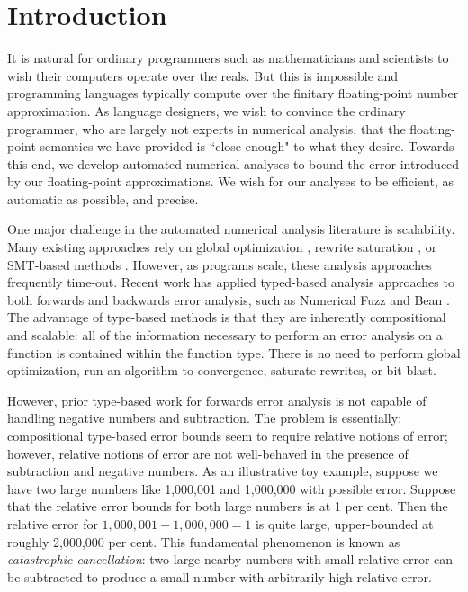 \section{Introduction}
It is natural for ordinary programmers such as mathematicians and scientists to
wish their computers operate over the reals. 
But this is impossible and programming languages typically compute over the
finitary floating-point number approximation.
As language designers, we wish to convince the ordinary programmer, who are
largely not experts in numerical analysis, that the floating-point semantics we
have provided is ``close enough" to what they desire.
Towards this end, we develop automated numerical analyses to bound the error
introduced by our floating-point approximations. We wish for our analyses to be
efficient, as automatic as possible, and precise.

One major challenge in the automated numerical analysis literature is
scalability. Many existing approaches rely on global optimization
\cite{fptaylor} \cite{satire}, rewrite saturation \cite{gappa}, or SMT-based
methods \cite{rosa}. However, as programs scale, these analysis approaches
frequently time-out. Recent work has applied typed-based analysis approaches to
both forwards and backwards error analysis, such as Numerical Fuzz
\cite{numfuzz} and Bean \cite{bean}. The advantage of type-based methods is that
they are inherently compositional and scalable: all of the information necessary
to perform an error analysis on a function is contained within the function
type. There is no need to perform global optimization, run an algorithm to
convergence, saturate rewrites, or bit-blast.

However, prior type-based work for forwards error analysis is not capable of
handling negative numbers and subtraction. The problem is essentially:
compositional type-based error bounds seem to require relative notions of error;
however, relative notions of error are not well-behaved in the presence of
subtraction and negative numbers. As an illustrative toy example, suppose we
have two large numbers like 1,000,001 and 1,000,000 with possible error. Suppose
that the relative error bounds for both large numbers is at 1 per cent. Then the
relative error for $1,000,001 - 1,000,000 = 1$ is quite large, upper-bounded at
roughly 2,000,000 per cent.
This fundamental phenomenon is known as \textit{catastrophic cancellation}: two
large nearby numbers with small relative error can be subtracted to produce a
small number with arbitrarily high relative error. 


